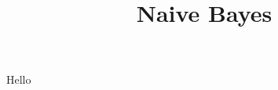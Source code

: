 \title{Naive Bayes}
\label{chp:naive-bayes}
\author{}
\institute{}
\maketitle

Hello
\cite{ElementsStatisticalLearning}



